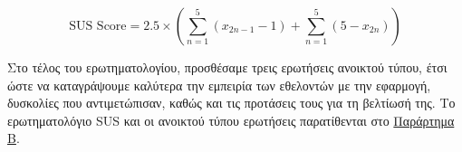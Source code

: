 \[
  \text{SUS Score} = 2.5 \times ( \sum_{n=1}^{5}(x_{2n - 1} - 1) + \sum_{n=1}^{5}(5 - x_{2n}))
\]

Στο τέλος του ερωτηματολογίου, προσθέσαμε τρεις ερωτήσεις ανοικτού τύπου, έτσι ώστε να καταγράψουμε καλύτερα την εμπειρία των εθελοντών με την εφαρμογή, δυσκολίες που αντιμετώπισαν, καθώς και τις προτάσεις τους για τη βελτίωσή της. Το ερωτηματολόγιο SUS και οι ανοικτού τύπου ερωτήσεις παρατίθενται στο \hyperref[ch:appendixB]{Παράρτημα Β}.

